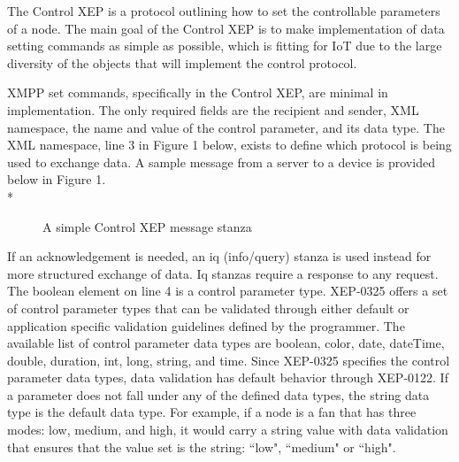 The Control XEP is a protocol outlining how to set the controllable parameters 
of a node. The main goal of the Control XEP is 
to make implementation of data setting commands as simple as possible, which is 
fitting for IoT due to the large diversity of the objects that will implement 
the control protocol.

XMPP set commands, specifically in the Control XEP, are minimal in implementation. 
The only required fields are the recipient and sender, XML namespace, the name 
and value of the control parameter, and its data type. The XML namespace, line 
3 in Figure 1 below, exists to define which protocol is being used to 
exchange data. A sample message from a server to a device is provided below in 
Figure 1.\\*
\begin{figure}

\caption{A simple Control XEP message stanza}
\end{figure}

If an acknowledgement is needed, an iq (info/query) stanza is used instead for more structured exchange of data\cite{rfc6120}. Iq stanzas require a response to any request.\\
The boolean element on line 4 is a control parameter type. XEP-0325 offers a set of control parameter types that can be validated through either default or application specific validation guidelines defined by the programmer. The available list of control parameter data types are boolean, color, date, dateTime, double, duration, int, long, string, and time. Since XEP-0325 specifies the control parameter data types, data validation has default behavior through XEP-0122. If a parameter does not fall under any of the defined data types, the string data type is the default data type. For example, if a node is a fan that has three modes: low, medium, and high, it would carry a string value with data validation that ensures that the value set is the string:  ``low",  ``medium" or  ``high".\\

